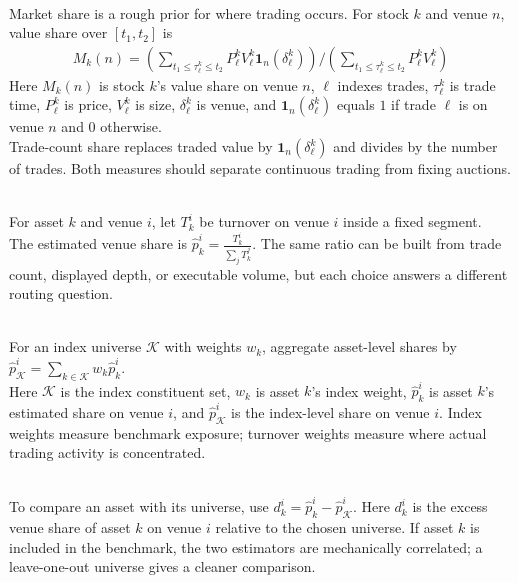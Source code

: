 \documentclass[a4paper,oneside,openany]{book}
\begin{document}
\begin{definition} \\
Market share is a rough prior for where trading occurs. For stock $k$ and venue $n$, value share over $[t_1,t_2]$ is
\begin{align}
M_k(n)= \left( \sum\limits_{t_1\leq \tau_\ell^k\leq t_2}P_\ell^kV_\ell^k\mathbf{1}_n(\delta_\ell^k) \right) / \left( \sum\limits_{t_1\leq \tau_\ell^k\leq t_2}P_\ell^kV_\ell^k \right) \nonumber
\end{align}
Here $M_k(n)$ is stock $k$'s value share on venue $n$, $\ell$ indexes trades, $\tau_\ell^k$ is trade time, $P_\ell^k$ is price, $V_\ell^k$ is size, $\delta_\ell^k$ is venue, and $\mathbf{1}_n(\delta_\ell^k)$ equals $1$ if trade $\ell$ is on venue $n$ and $0$ otherwise.\\
Trade-count share replaces traded value by $\mathbf{1}_n(\delta_\ell^k)$ and divides by the number of trades. Both measures should separate continuous trading from fixing auctions.
\end{definition}

\begin{model} \\
For asset $k$ and venue $i$, let $T_k^i$ be turnover on venue $i$ inside a fixed segment.\\
The estimated venue share is $\hat{p}_k^i=\frac{T_k^i}{\sum\limits_j T_k^j}$. The same ratio can be built from trade count, displayed depth, or executable volume, but each choice answers a different routing question.
\end{model}

\begin{model} \\
For an index universe $\mathcal{K}$ with weights $w_k$, aggregate asset-level shares by $\hat{p}_{\mathcal{K}}^i=\sum\limits_{k\in\mathcal{K}}w_k\hat{p}_k^i$.\\
Here $\mathcal{K}$ is the index constituent set, $w_k$ is asset $k$'s index weight, $\hat{p}_k^i$ is asset $k$'s estimated share on venue $i$, and $\hat{p}_{\mathcal{K}}^i$ is the index-level share on venue $i$. Index weights measure benchmark exposure; turnover weights measure where actual trading activity is concentrated.
\end{model}

\begin{practitionernote} \\
To compare an asset with its universe, use $d_k^i=\hat{p}_k^i-\hat{p}_{\mathcal{K}}^i$. Here $d_k^i$ is the excess venue share of asset $k$ on venue $i$ relative to the chosen universe. If asset $k$ is included in the benchmark, the two estimators are mechanically correlated; a leave-one-out universe gives a cleaner comparison.
\end{practitionernote}
\end{document}
